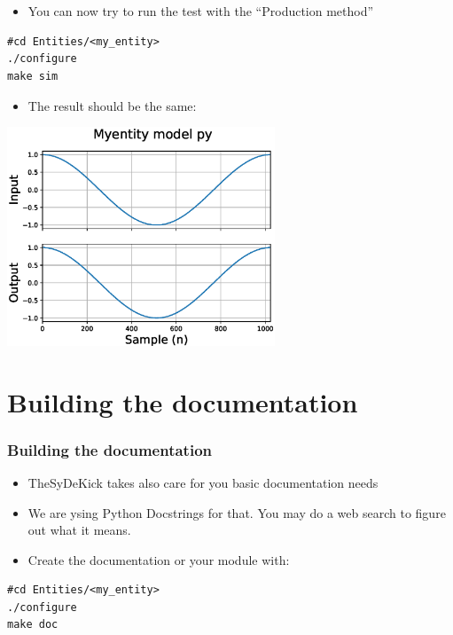 \documentclass{sdkslides}
\begin{document}
\section*{\sectionname}
\nextlines[45]
\begin{frame}[t,fragile]
    \frametitle{\sectionname} 
    \begin{itemize}
        \item You can now try to run the test with the ``Production method''
    \end{itemize}
\begin{lstlisting}
#cd Entities/<my_entity>
./configure
make sim
\end{lstlisting}
    \begin{itemize}
        \item The result should be the same:
    \end{itemize}
    \begin{center}
        \includegraphics[width=0.6\textwidth]{./Pics/inv_py.eps}
    \end{center}
\end{frame}


\renewcommand{\sectionname}{Building the documentation}
\section*{\sectionname}
\begin{frame}[t,fragile]
    \frametitle{\sectionname} 
    \begin{itemize}
        \item TheSyDeKick takes also care for you basic documentation needs
        \item We are ysing Python Docstrings for that. You may do a web search
            to figure out what it means.
        \item Create the documentation or your module with:

    \end{itemize}
\begin{lstlisting}
#cd Entities/<my_entity>
./configure
make doc
\end{lstlisting}
\end{frame}
\end{document}
